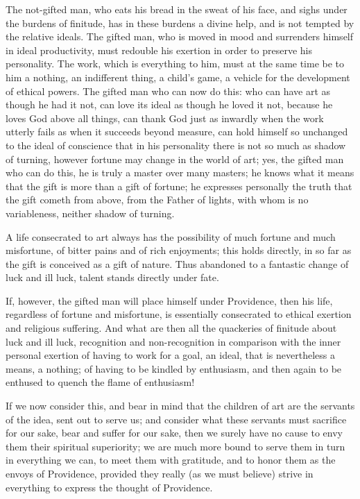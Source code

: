 \documentclass[12pt,a4paper,openany]{book}
\newcommand{\opage}[1]{\marginnote{\footnotesize\textit{[#1]}}}
\begin{document}
The not-gifted man, who eats his bread in the sweat of his
face, and sighs under the burdens of finitude,
has in these burdens a divine
help, and is not tempted by the relative ideals.
The gifted man, who is moved in mood and surrenders
himself in ideal productivity, must redouble his
exertion in order to preserve his personality.
The work, which is everything to him, must at the same time be to him
a nothing, an indifferent thing, a child's game, a vehicle
for the development of ethical powers. The
gifted man who can now do this: who can have
art as though he had it not, can love
its ideal as though he loved it not, because
he loves God above all things, can thank God
just as inwardly when the work utterly fails
as when it succeeds beyond measure, can hold
himself so unchanged to the ideal of conscience
that in his personality there is not so much as shadow
of turning, however fortune may change in
the world of art; yes, the gifted man who can
do this, he is truly a master over
many masters; he knows what it means
\setcounter{footnote}{0}%
\opage{70}that the gift is more than a gift of fortune; he
expresses personally the truth that the gift
cometh from above, from the Father of lights, with
whom is no variableness, neither shadow of
turning.

A life consecrated to art always has
the possibility of much fortune and much misfortune, of
bitter pains and of rich enjoyments; this
holds directly, in so far as the gift is conceived as
a gift of nature. Thus abandoned to a fantastic
change of luck and ill luck, talent stands directly
under fate.

If, however, the gifted man will place himself under
Providence, then his life, regardless of
fortune and misfortune, is essentially consecrated to ethical exertion
and religious suffering. And what are
then all the quackeries of finitude about luck and
ill luck, recognition and non-recognition in
comparison with the inner personal exertion
of having to work for a goal, an
ideal, that is nevertheless a means, a nothing; of
having to be kindled by enthusiasm, and then again
to be enthused to quench the flame of enthusiasm!

If we now consider this, and bear in mind that the
children of art are the servants of the idea, sent out to
\setcounter{footnote}{0}%
\opage{71}serve us; and consider what these servants
must sacrifice for our sake, bear and suffer for our
sake, then we surely have no cause to
envy them their spiritual superiority; we are
much more bound to serve them in turn in
everything we can, to meet them with gratitude,
and to honor them as the envoys of Providence,
provided they really (as we must believe)
strive in everything to express the thought
of Providence.
\end{document}
